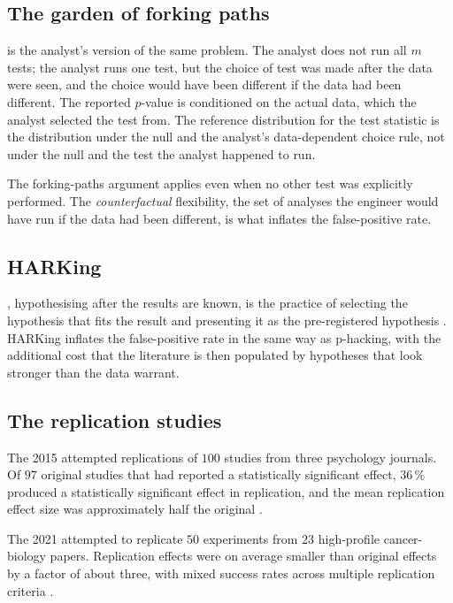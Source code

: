\subsection{The garden of forking paths}

 \cite{method:gelman-loken-forking-paths}
is the analyst's version of the same problem. The analyst does not
run all $m$ tests; the analyst runs one test, but the choice of
test was made after the data were seen, and the choice would have
been different if the data had been different. The reported
$p$-value is conditioned on the actual data, which the analyst
selected the test from. The reference distribution for the test
statistic is the distribution under the null and the analyst's
data-dependent choice rule, not under the null and the test the
analyst happened to run.

The forking-paths argument applies even when no other test was
explicitly performed. The \emph{counterfactual} flexibility, the
set of analyses the engineer would have run if the data had been
different, is what inflates the false-positive rate.

\subsection{HARKing}

, hypothesising after the results are known, is
the practice of selecting the hypothesis that fits the result and
presenting it as the pre-registered hypothesis
\cite{method:kerr-harking-1998}. HARKing inflates the false-positive
rate in the same way as p-hacking, with the additional cost that
the literature is then populated by hypotheses that look stronger
than the data warrant.

\subsection{The replication studies}

The 2015  attempted
replications of $100$ studies from three psychology journals. Of
$97$ original studies that had reported a statistically significant
effect, $36\,\%$ produced a statistically significant effect in
replication, and the mean replication effect size was approximately
half the original \cite{method:open-science-collaboration-2015}.

The 2021 
attempted to replicate $50$ experiments from $23$ high-profile
cancer-biology papers. Replication effects were on average smaller
than original effects by a factor of about three, with mixed
success rates across multiple replication criteria
\cite{method:errington-cancer-biology-2021}.

